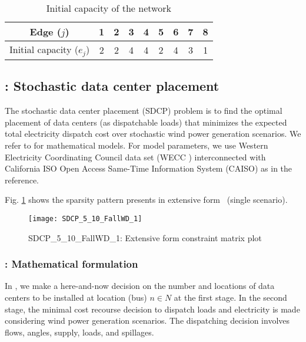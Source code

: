 \begin{table}[H]
	\centering
	\caption{Initial capacity of the network \cite{journal:AF2004}} 
	\begin{tabular}{|c|c|c|c|c|c|c|c|c|}
		\hline
		Edge ($j$)             & 1 & 2 & 3 & 4 & 5 & 6 & 7 & 8 \\ \hline
		Initial capacity ($e_j$) & 2 & 2 & 4 & 4 & 2 & 4 & 3 & 1 \\ \hline
	\end{tabular}
	\label{table:phone_network}
\end{table}

\subsection{\sdcp: Stochastic data center placement} \label{SDCP}
The stochastic data center placement (SDCP) problem is to find the optimal placement of data centers (as dispatchable loads) that minimizes the expected total electricity dispatch cost over stochastic wind power generation scenarios. We refer to \cite{journal:KYZC2017} for mathematical models. For model parameters, we use Western Electricity Coordinating Council data set (WECC \cite{web:wecc}) interconnected with California ISO Open Access Same-Time Information System (CAISO) as in the reference. 

Fig. \ref{fig:sdcp_sparsity} shows the sparsity pattern presents in extensive form \sdcp\ (single scenario).
\begin{figure}[H]
	\centering
	\texttt{[image: SDCP\_5\_10\_FallWD\_1]}
	\caption{SDCP\_5\_10\_FallWD\_1: Extensive form constraint matrix plot}
	\label{fig:sdcp_sparsity}
\end{figure}

\subsubsection{\sdcp: Mathematical formulation}
In \sdcp, we make a here-and-now decision on the number and locations of data centers to be installed at location (bus) $n\in N$ at the first stage. In the second stage, the minimal cost recourse decision to dispatch loads and electricity is made considering wind power generation scenarios. The dispatching decision involves flows, angles, supply, loads, and spillages.

